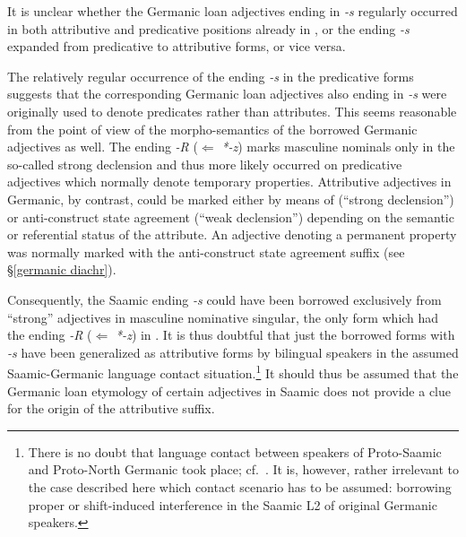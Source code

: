 {It is unclear whether the Germanic loan adjectives ending in \textit{-s} regularly occurred in both attributive and predicative positions already in , or the ending \textit{-s} expanded from predicative to attributive forms, or vice versa.

The relatively regular occurrence of the ending \textit{-s} in the predicative forms suggests that the corresponding Germanic loan adjectives also ending in \textit{-s} were originally used to denote predicates rather than attributes. This seems reasonable from the point of view of the morpho-semantics of the borrowed Germanic adjectives as well. The ending \textit{-R} ($\Leftarrow$ \textit{*-z}) marks masculine nominals only in the so-called strong declension and thus more likely occurred on predicative adjectives which normally denote temporary properties. Attributive adjectives in Germanic, by contrast, could be marked either by means of  (“strong declension”) or anti\hyp{}construct state agreement (“weak declension”) depending on the semantic or referential status of the attribute. An adjective denoting a permanent property was normally marked with the anti\hyp{}construct state agreement suffix (see \S\ref{germanic diachr}).

Consequently, the Saamic ending \textit{-s} could have been borrowed exclusively from “strong” adjectives in masculine nominative singular, the only form which had the ending \textit{-R} ($\Leftarrow$ \textit{*-z}) in . It is thus doubtful that just the borrowed forms with \textit{-s} have been generalized as attributive forms by bilingual speakers in the assumed Saamic-Germanic language contact situation.\footnote{There is no doubt that language contact between speakers of Proto\hyp{}Saamic and Proto\hyp{}North Germanic took place; cf.~\citealt{kusmenko2008}. It is, however, rather irrelevant to the case described here which contact scenario has to be assumed: borrowing proper or shift-induced interference in the Saamic L2 of original Germanic speakers.} It should thus be assumed that the Germanic loan etymology of certain adjectives in Saamic does not provide a clue for the origin of the attributive suffix. 

}
